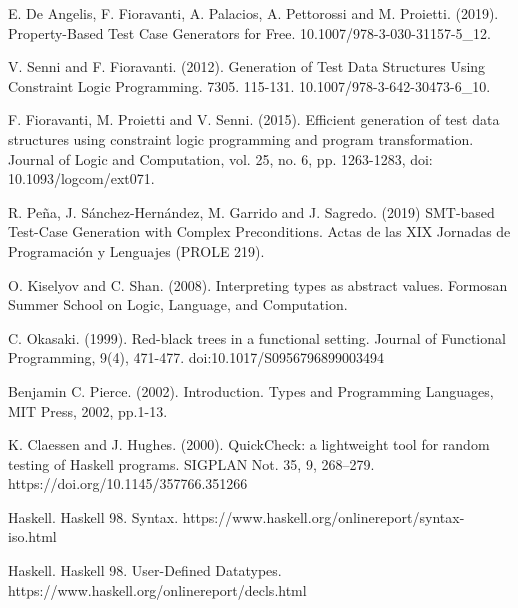 \documentclass{report}
\theoremstyle{definition}
\theoremstyle{definition}
\begin{document}
\begin{thebibliography}{9}
	E. De Angelis, F. Fioravanti, A. Palacios, A. Pettorossi and M. Proietti. (2019). Property-Based Test Case Generators for Free. 10.1007/978-3-030-31157-5\_12. 
						
	V. Senni and F. Fioravanti. (2012). Generation of Test Data Structures Using Constraint Logic Programming. 7305. 115-131. 10.1007/978-3-642-30473-6\_10.
						
	F. Fioravanti, M. Proietti and V. Senni. (2015). Efficient generation of test data structures using constraint logic programming and program transformation. Journal of Logic and Computation, vol. 25, no. 6, pp. 1263-1283, doi: 10.1093/logcom/ext071.
						
	R. Peña, J. Sánchez-Hernández, M. Garrido and J. Sagredo. (2019) SMT-based Test-Case Generation with Complex Preconditions. Actas de las XIX Jornadas de Programación y Lenguajes (PROLE 219).
						
	O. Kiselyov and C. Shan. (2008). Interpreting types as abstract values. Formosan Summer School on Logic, Language, and Computation.
						
	C. Okasaki. (1999). Red-black trees in a functional setting. Journal of Functional Programming, 9(4), 471-477. doi:10.1017/S0956796899003494
						
	Benjamin C. Pierce. (2002). Introduction. Types and Programming Languages, MIT Press, 2002, pp.1-13.
						
	K. Claessen and J. Hughes. (2000). QuickCheck: a lightweight tool for random testing of Haskell programs. SIGPLAN Not. 35, 9, 268–279. https://doi.org/10.1145/357766.351266
						
	Haskell. Haskell 98. Syntax. https://www.haskell.org/onlinereport/syntax-iso.html
						
	Haskell. Haskell 98. User-Defined Datatypes. https://www.haskell.org/onlinereport/decls.html
						
						
\end{thebibliography}
\end{document}
